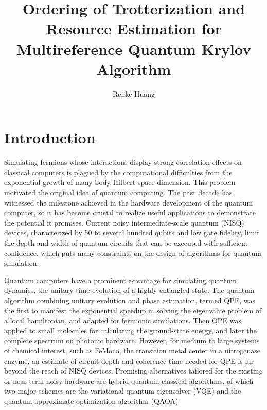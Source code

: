 \documentclass[journal=jctcce,manuscript=article]{achemso}
\author{Renke Huang}
\affiliation{Department of Chemistry and Cherry Emerson Center for Scientific Computation, Emory University, Atlanta, GA, 30322}
\title{Ordering of Trotterization and Resource Estimation for Multireference Quantum Krylov Algorithm }
\let\oldmaketitle\maketitle
\let\maketitle\relax
\begin{document}



\section{Introduction}

Simulating fermions whose interactions display strong correlation effects on classical computers is plagued by the computational difficulties from the exponential growth of many-body Hilbert space dimension.\cite{Laughlin:2000br} 
This problem motivated the original idea of quantum computing.\cite{Feynman:1982gn, manin1980computable} 
The past decade has witnessed the milestone achieved in the hardware development of the quantum computer,\cite{Arute:2019fg} so it has become crucial to realize useful applications to demonstrate the potential it promises. Current noisy intermediate-scale quantum (NISQ) devices,\cite{Preskill:2018gt} characterized by 50 to several hundred qubits and low gate fidelity, limit the depth and width of quantum circuits that can be executed with sufficient confidence, which puts many constraints on the design of algorithms for quantum simulation.

Quantum computers have a prominent advantage for simulating quantum dynamics, the unitary time evolution of a highly-entangled state.\cite{Kassal:2008bf}
The quantum algorithm combining unitary evolution and phase estimation, termed QPE, was the first to manifest the exponential speedup in solving the eigenvalue problem of a local hamiltonian,\cite{Abrams:1997ha, Abrams:1999ur} and adapted for fermionic simulations.\cite{Ortiz:2001jn} 
Then QPE was applied to small molecules for calculating the ground-state energy,\cite{AspuruGuzik:dj} and later the complete spectrum on photonic hardware.\cite{Lanyon:2010jf}
However, for medium to large systems of chemical interest, such as FeMoco, the transition metal center in a nitrogenase enzyme, an estimate of circuit depth and coherence time needed for QPE is far beyond the reach of NISQ devices.\cite{Reiher:2017cv}
Promising alternatives tailored for the existing or near-term noisy hardware are hybrid quantum-classical algorithms, of which two major schemes are the variational quantum eigensolver (VQE)\cite{Peruzzo:2014kc, Yung:2014iv, McClean:2015bs} and the quantum approximate optimization algorithm (QAOA)\cite{Farhi:2014wl}  
\end{document}

